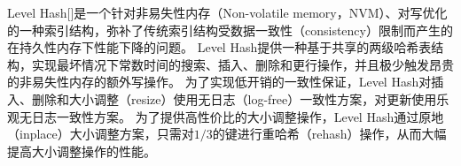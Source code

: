 
Level Hash[]是一个针对非易失性内存（Non-volatile memory，NVM）、对写优化的一种索引结构，弥补了传统索引结构受数据一致性（consistency）限制而产生的在持久性内存下性能下降的问题。
Level Hash提供一种基于共享的两级哈希表结构，实现最坏情况下常数时间的搜索、插入、删除和更行操作，并且极少触发昂贵的非易失性内存的额外写操作。
为了实现低开销的一致性保证，Level Hash对插入、删除和大小调整（resize）使用无日志（log-free）一致性方案，对更新使用乐观无日志一致性方案。
为了提供高性价比的大小调整操作，Level Hash通过原地（inplace）大小调整方案，只需对$1/3$的键进行重哈希（rehash）操作，从而大幅提高大小调整操作的性能。


